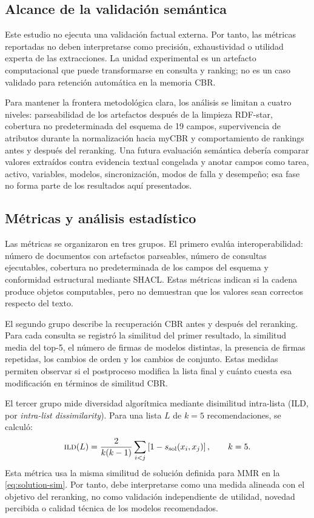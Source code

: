\documentclass[11pt,a4paper]{article}
\newcommand{\myCBR}{myCBR}
\newcommand{\ILD}{\textsc{ild}}
\begin{document}
\subsection{Alcance de la validación semántica}
\label{sec:semantic-scope}

Este estudio no ejecuta una validación factual externa. Por tanto, las métricas reportadas no deben interpretarse como precisión, exhaustividad o utilidad experta de las extracciones. La unidad experimental es un artefacto computacional que puede transformarse en consulta y ranking; no es un caso validado para retención automática en la memoria CBR.

Para mantener la frontera metodológica clara, los análisis se limitan a cuatro niveles: parseabilidad de los artefactos después de la limpieza RDF-star, cobertura no predeterminada del esquema de 19 campos, supervivencia de atributos durante la normalización hacia \myCBR{} y comportamiento de rankings antes y después del reranking. Una futura evaluación semántica debería comparar valores extraídos contra evidencia textual congelada y anotar campos como tarea, activo, variables, modelos, sincronización, modos de falla y desempeño; esa fase no forma parte de los resultados aquí presentados.

\subsection{Métricas y análisis estadístico}

Las métricas se organizaron en tres grupos. El primero evalúa interoperabilidad: número de documentos con artefactos parseables, número de consultas ejecutables, cobertura no predeterminada de los campos del esquema y conformidad estructural mediante SHACL. Estas métricas indican si la cadena produce objetos computables, pero no demuestran que los valores sean correctos respecto del texto.

El segundo grupo describe la recuperación CBR antes y después del reranking. Para cada consulta se registró la similitud del primer resultado, la similitud media del top-5, el número de firmas de modelos distintas, la presencia de firmas repetidas, los cambios de orden y los cambios de conjunto. Estas medidas permiten observar si el postproceso modifica la lista final y cuánto cuesta esa modificación en términos de similitud CBR.

El tercer grupo mide diversidad algorítmica mediante disimilitud intra-lista (ILD, por \emph{intra-list dissimilarity}). Para una lista $L$ de $k=5$ recomendaciones, se calculó:
\begin{equation}
 \ILD(L)=\frac{2}{k(k-1)}\sum_{i<j}\left[1-s_{\mathrm{sol}}(x_i,x_j)\right],\qquad k=5.
 \label{eq:ild}
\end{equation}
Esta métrica usa la misma similitud de solución definida para MMR en la \cref{eq:solution-sim}. Por tanto, debe interpretarse como una medida alineada con el objetivo del reranking, no como validación independiente de utilidad, novedad percibida o calidad técnica de los modelos recomendados.
\end{document}
